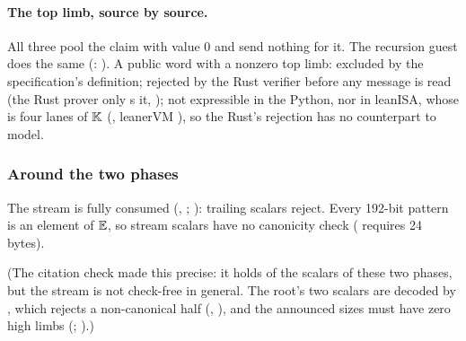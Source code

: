 \paragraph{The top limb, source by source.} All three pool the claim with value 0 and send
nothing for it. The recursion guest does the same (:
). A public word with a nonzero top limb: excluded by the
specification's definition; rejected by the Rust verifier before any message is read (the Rust
prover only s it, ); not expressible in the Python,
nor in leanISA, whose  is four lanes of $\mathbb{K}$
(, leanerVM ), so the Rust's rejection
has no counterpart to model.

\subsubsection{Around the two phases}\label{sec:gen-table-pub-checks-around}

The stream is fully consumed (, ; ):
trailing scalars reject. Every 192-bit pattern is an element of $\mathbb{E}$, so stream scalars have no
canonicity check ( requires 24 bytes).

(The citation check made this precise: it holds of the scalars of these two phases, but the
stream is not check-free in general. The root's two scalars are decoded by
, which rejects a non-canonical half (,
), and the announced sizes must have zero high limbs
(; ).)
